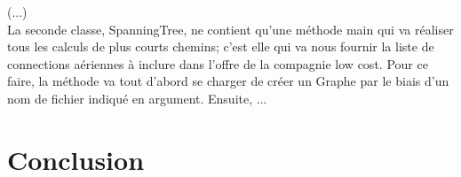 \documentclass[10pt,a4paper]{article}
\begin{document}
(...)\\

La seconde classe, SpanningTree, ne contient qu'une méthode main qui va réaliser tous les calculs de plus courts chemins; c'est elle qui va nous fournir la liste de connections aériennes à inclure dans l'offre de la compagnie low cost. Pour ce faire, la méthode va tout d'abord se charger de créer un Graphe par le biais d'un nom de fichier indiqué en argument. Ensuite, ...

\section*{Conclusion}
\end{document}
